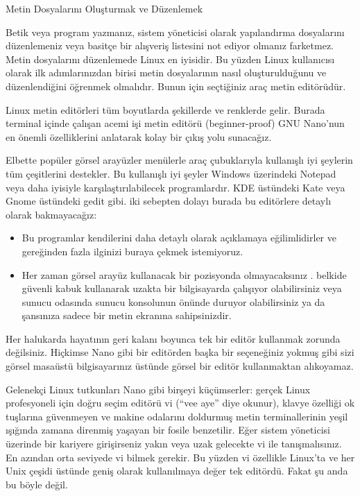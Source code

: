 \documentclass[10pt,a5paper]{book}
\begin{document}
\begin{section}{Metin Dosyalarını Oluşturmak ve Düzenlemek}

Betik veya program yazmanız, sistem yöneticisi olarak yapılandırma dosyalarını düzenlemeniz veya basitçe bir alışveriş listesini not ediyor olmanız farketmez. Metin dosyalarını düzenlemede Linux en iyisidir. Bu yüzden Linux kullanıcısı olarak ilk adımlarınızdan birisi metin dosyalarının nasıl oluşturulduğunu ve düzenlendiğini öğrenmek olmalıdır. Bunun için seçtiğiniz araç metin editörüdür. 

Linux metin editörleri tüm boyutlarda şekillerde ve renklerde gelir. Burada terminal içinde çalışan acemi işi metin editörü (beginner-proof) GNU Nano’nun en önemli özelliklerini anlatarak kolay bir çıkış yolu sunacağız.

Elbette popüler görsel arayüzler menülerle araç çubuklarıyla kullanışlı iyi şeylerin tüm çeşitlerini destekler.  Bu kullanışlı iyi şeyler Windows üzerindeki Notepad veya daha iyisiyle karşılaştırılabilecek programlardır. KDE üstündeki Kate veya Gnome üstündeki gedit gibi. iki sebepten dolayı  burada bu editörlere detaylı olarak bakmayacağız:

\begin{itemize}
\item Bu programlar kendilerini daha detaylı olarak açıklamaya eğilimlidirler ve gereğinden fazla ilginizi buraya çekmek istemiyoruz. 
\item Her zaman görsel arayüz kullanacak bir pozisyonda olmayacaksınız . belkide güvenli kabuk kullanarak uzakta bir bilgisayarda çalışıyor olabilirsiniz veya sunucu odasında sunucu konsolunun önünde duruyor olabilirsiniz ya da şansınıza sadece bir metin ekranına sahipsinizdir. 
\end{itemize}

Her halukarda hayatının geri kalanı boyunca tek bir editör kullanmak zorunda değilsiniz. Hiçkimse Nano gibi bir editörden başka bir seçeneğiniz yokmuş gibi sizi görsel masaüstü bilgisayarınız üstünde görsel bir editör kullanmaktan alıkoyamaz.
 
Gelenekçi Linux tutkunları Nano gibi birşeyi küçümserler: gerçek Linux profesyoneli için doğru seçim editörü vi (“vee aye” diye okunur), klavye özelliği ok tuşlarına güvenmeyen ve makine odalarını doldurmuş metin terminallerinin yeşil ışığında zamana direnmiş yaşayan bir fosile benzetilir. Eğer sistem yöneticisi üzerinde bir kariyere girişirseniz yakın veya uzak gelecekte vi ile tanışmalısınız. En azından orta seviyede vi bilmek gerekir. Bu yüzden vi özellikle Linux’ta ve her Unix çeşidi üstünde geniş olarak kullanılmaya değer tek editördü. Fakat şu anda bu böyle değil. 


\end{section}
\end{document}
